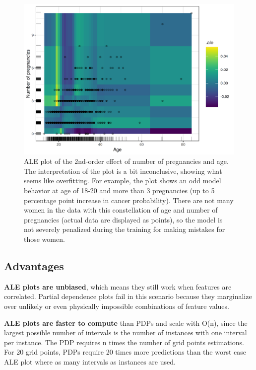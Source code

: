 \documentclass[12pt,]{krantz}
\begin{document}
\begin{figure}

{\centering \includegraphics[width=\textwidth]{images/ale-cervical-2d-1} 

}

\caption{ALE plot of the 2nd-order effect of number of pregnancies and age. The interpretation of the plot is a bit inconclusive, showing what seems like overfitting. For example, the plot shows an odd model behavior at age of 18-20 and more than 3 pregnancies (up to 5 percentage point increase in cancer probability). There are not many women in the data with this constellation of age and number of pregnancies (actual data are displayed as points), so the model is not severely penalized during the training for making mistakes for those women.}\label{fig:ale-cervical-2d}
\end{figure}

\subsection{Advantages}\label{advantages-6}

\textbf{ALE plots are unbiased}, which means they still work when
features are correlated. Partial dependence plots fail in this scenario
because they marginalize over unlikely or even physically impossible
combinations of feature values.

\textbf{ALE plots are faster to compute} than PDPs and scale with O(n),
since the largest possible number of intervals is the number of
instances with one interval per instance. The PDP requires n times the
number of grid points estimations. For 20 grid points, PDPs require 20
times more predictions than the worst case ALE plot where as many
intervals as instances are used.
\end{document}
